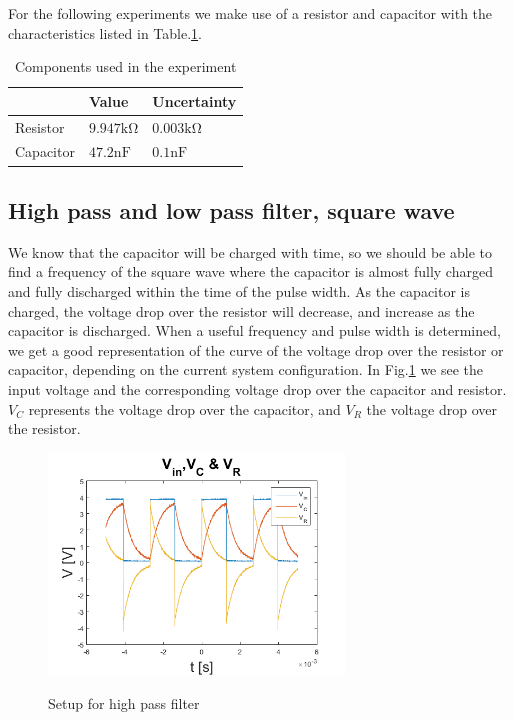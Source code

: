 \documentclass[../main/main.tex]{subfiles}
\begin{document}
For the following experiments we make use of a resistor and capacitor with the characteristics listed in Table.\ref{components}.

\begin{table}[]
\centering
\caption{Components used in the experiment}
\label{components}
\begin{tabular}{|l|l|l|}
\hline
          & Value                         & Uncertainty                  \\ \hline
Resistor  & \( 9.947 \si{\kilo\ohm} \)  & \( 0.003 \si{\kilo\ohm} \) \\ \hline
Capacitor & \( 47.2 \si{\nano\farad} \) & \( 0.1 \si{\nano\farad} \) \\ \hline
\end{tabular}
\end{table}

\subsection*{High pass and low pass filter, square wave}

We know that the capacitor will be charged with time, so we should be able to find a frequency of the square wave where the capacitor is almost fully charged and fully discharged within the time of the pulse width.
As the capacitor is charged, the voltage drop over the resistor will decrease, and increase as the capacitor is discharged.
When a useful frequency and pulse width is determined, we get a good representation of the curve of the voltage drop over the resistor or capacitor, depending on the current system configuration.
In Fig.\ref{fig:VinVCVR} we see the input voltage and the corresponding voltage drop over the capacitor and resistor.
\( V_C \) represents the voltage drop over the capacitor, and \( V_R \) the voltage drop over the resistor.

\begin{figure}[!ht]
  \caption{Setup for high pass filter}
  \centering
    \includegraphics[width=0.7\textwidth]{../img/VinVCVR.png}
    \label{fig:VinVCVR}
\end{figure}
\end{document}
